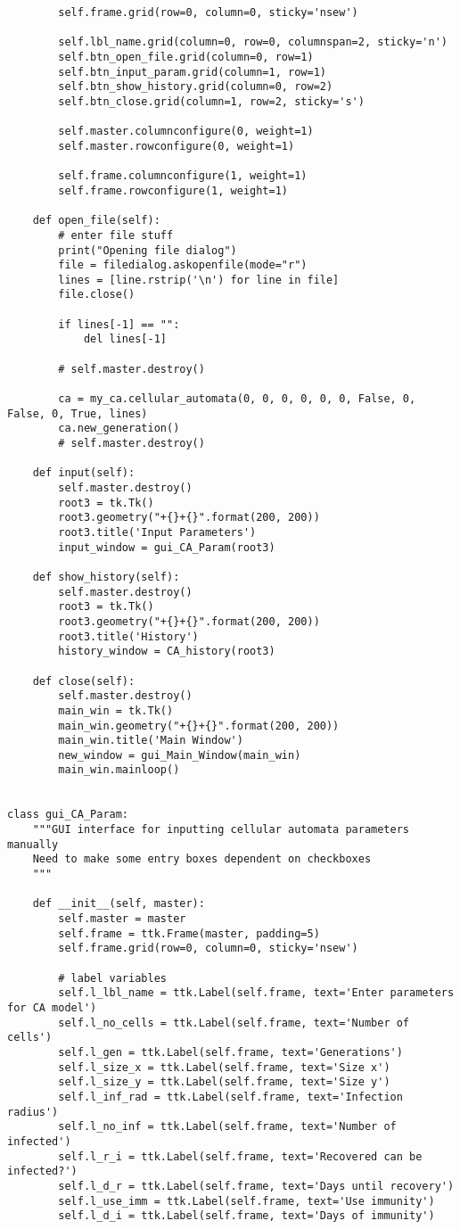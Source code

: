 \documentclass[11pt, a4paper]{article}
\begin{document}
\begin{lstlisting}
        self.frame.grid(row=0, column=0, sticky='nsew')

        self.lbl_name.grid(column=0, row=0, columnspan=2, sticky='n')
        self.btn_open_file.grid(column=0, row=1)
        self.btn_input_param.grid(column=1, row=1)
        self.btn_show_history.grid(column=0, row=2)
        self.btn_close.grid(column=1, row=2, sticky='s')

        self.master.columnconfigure(0, weight=1)
        self.master.rowconfigure(0, weight=1)

        self.frame.columnconfigure(1, weight=1)
        self.frame.rowconfigure(1, weight=1)

    def open_file(self):
        # enter file stuff
        print("Opening file dialog")
        file = filedialog.askopenfile(mode="r")
        lines = [line.rstrip('\n') for line in file]
        file.close()

        if lines[-1] == "":
            del lines[-1]

        # self.master.destroy()

        ca = my_ca.cellular_automata(0, 0, 0, 0, 0, 0, False, 0, False, 0, True, lines)
        ca.new_generation()
        # self.master.destroy()

    def input(self):
        self.master.destroy()
        root3 = tk.Tk()
        root3.geometry("+{}+{}".format(200, 200))
        root3.title('Input Parameters')
        input_window = gui_CA_Param(root3)

    def show_history(self):
        self.master.destroy()
        root3 = tk.Tk()
        root3.geometry("+{}+{}".format(200, 200))
        root3.title('History')
        history_window = CA_history(root3)

    def close(self):
        self.master.destroy()
        main_win = tk.Tk()
        main_win.geometry("+{}+{}".format(200, 200))
        main_win.title('Main Window')
        new_window = gui_Main_Window(main_win)
        main_win.mainloop()


class gui_CA_Param:
    """GUI interface for inputting cellular automata parameters manually
    Need to make some entry boxes dependent on checkboxes
    """

    def __init__(self, master):
        self.master = master
        self.frame = ttk.Frame(master, padding=5)
        self.frame.grid(row=0, column=0, sticky='nsew')

        # label variables
        self.l_lbl_name = ttk.Label(self.frame, text='Enter parameters for CA model')
        self.l_no_cells = ttk.Label(self.frame, text='Number of cells')
        self.l_gen = ttk.Label(self.frame, text='Generations')
        self.l_size_x = ttk.Label(self.frame, text='Size x')
        self.l_size_y = ttk.Label(self.frame, text='Size y')
        self.l_inf_rad = ttk.Label(self.frame, text='Infection radius')
        self.l_no_inf = ttk.Label(self.frame, text='Number of infected')
        self.l_r_i = ttk.Label(self.frame, text='Recovered can be infected?')
        self.l_d_r = ttk.Label(self.frame, text='Days until recovery')
        self.l_use_imm = ttk.Label(self.frame, text='Use immunity')
        self.l_d_i = ttk.Label(self.frame, text='Days of immunity')


\end{lstlisting}
\end{document}
